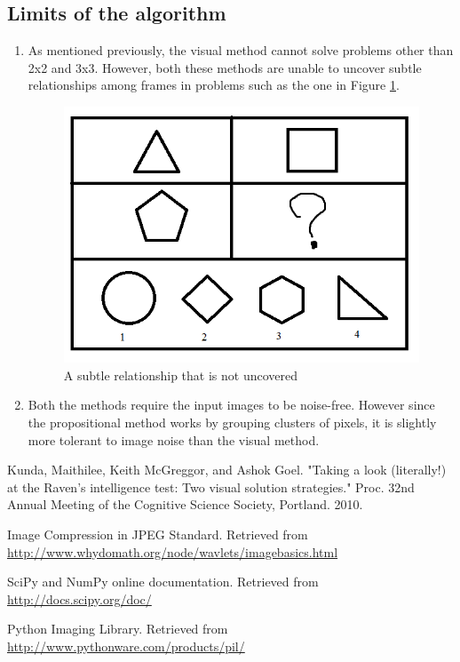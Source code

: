 \documentclass[10pt, letter]{article}
\begin{document}
\subsection*{Limits of the algorithm}
\begin{enumerate}
\item As mentioned previously, the visual method cannot solve problems other than 2x2 and 3x3. However, both these methods are unable to uncover subtle relationships among frames in problems such as the one in Figure \ref{con1}.

\begin{figure}[h!]
  \centering
    \includegraphics[scale = 0.3]{Images/con1}
    \caption{A subtle relationship that is not uncovered}
  \label{con1}
\end{figure}

\item Both the methods require the input images to be noise-free. However since the propositional method works by grouping clusters of pixels, it is slightly more tolerant to image noise than the visual method.
\end{enumerate}

\begin{thebibliography}{10}
 Kunda, Maithilee, Keith McGreggor, and Ashok Goel. "Taking a look (literally!) at the Raven’s intelligence test: Two visual solution strategies." Proc. 32nd Annual Meeting of the Cognitive Science Society, Portland. 2010.

 Image Compression in JPEG Standard. Retrieved from \url{http://www.whydomath.org/node/wavlets/imagebasics.html}

 SciPy and NumPy online documentation. Retrieved from \url{http://docs.scipy.org/doc/}

 Python Imaging Library. Retrieved from \url{http://www.pythonware.com/products/pil/}

\end{thebibliography}
\end{document}
